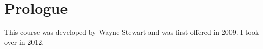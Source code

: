 \section{Prologue}

This course was developed by Wayne Stewart and was first offered in 2009.
I took over in 2012.
